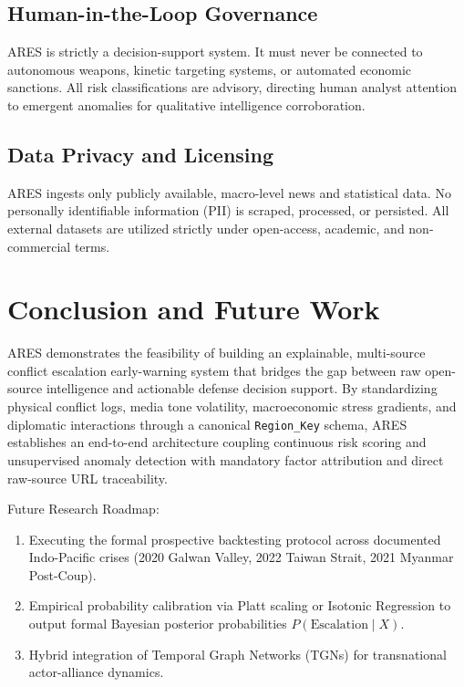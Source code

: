 \documentclass[preprint,12pt]{elsarticle}
\begin{document}
\subsection{Human-in-the-Loop Governance}
ARES is strictly a decision-support system. It must never be connected to autonomous weapons, kinetic targeting systems, or automated economic sanctions. All risk classifications are advisory, directing human analyst attention to emergent anomalies for qualitative intelligence corroboration.

\subsection{Data Privacy and Licensing}
ARES ingests only publicly available, macro-level news and statistical data. No personally identifiable information (PII) is scraped, processed, or persisted. All external datasets are utilized strictly under open-access, academic, and non-commercial terms.

\section{Conclusion and Future Work}
\label{sec:conclusion}

ARES demonstrates the feasibility of building an explainable, multi-source conflict escalation early-warning system that bridges the gap between raw open-source intelligence and actionable defense decision support. By standardizing physical conflict logs, media tone volatility, macroeconomic stress gradients, and diplomatic interactions through a canonical \texttt{Region\_Key} schema, ARES establishes an end-to-end architecture coupling continuous risk scoring and unsupervised anomaly detection with mandatory factor attribution and direct raw-source URL traceability.

Future Research Roadmap:
\begin{enumerate}
    \item Executing the formal prospective backtesting protocol across documented Indo-Pacific crises (2020 Galwan Valley, 2022 Taiwan Strait, 2021 Myanmar Post-Coup).
    \item Empirical probability calibration via Platt scaling or Isotonic Regression to output formal Bayesian posterior probabilities $P(\text{Escalation} \mid X)$.
    \item Hybrid integration of Temporal Graph Networks (TGNs) for transnational actor-alliance dynamics.
\end{enumerate}



\end{document}
